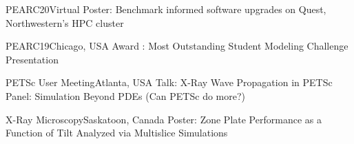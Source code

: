 {PEARC20}{Virtual} 
{\newline Poster: Benchmark informed software upgrades on Quest, Northwestern’s HPC cluster}
{}
{}


{PEARC19}{Chicago, USA} 
{\newline Award : Most Outstanding Student Modeling Challenge Presentation}
{}
{}

{PETSc User Meeting}{Atlanta, USA}
{\newline Talk: X-Ray Wave Propagation in PETSc} 
{\newline Panel: Simulation Beyond PDEs (Can PETSc do more?)}
{}


{X-Ray Microscopy}{Saskatoon, Canada}
{\newline Poster: Zone Plate Performance as a Function of Tilt Analyzed via Multislice Simulations} 
{}
{}


